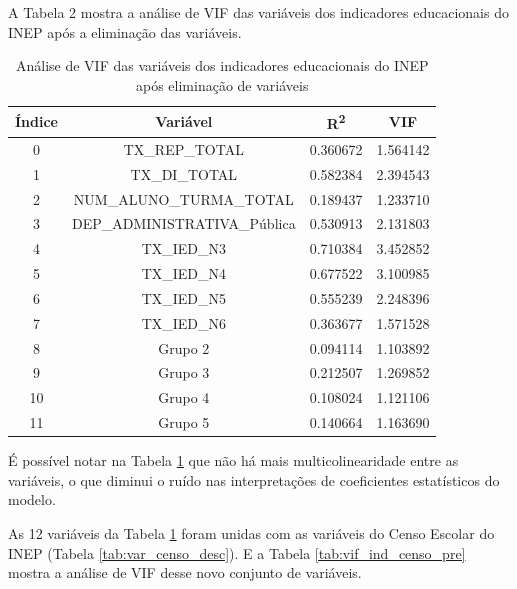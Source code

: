 \documentclass[english, spanish, brazilian]{RBIEarticle} %
\begin{document}
A Tabela 2 mostra a  análise de VIF das variáveis dos indicadores educacionais do INEP após a eliminação das variáveis.

\begin{table}[H]
\centering
\begin{tabular}{ccc c}
\hline
\textbf{Índice} & \textbf{Variável} & \textbf{R\textsuperscript{2}} & \textbf{VIF} \\ 
\hline
0  & TX\_REP\_TOTAL               & 0.360672 & 1.564142 \\
1  & TX\_DI\_TOTAL                & 0.582384 & 2.394543 \\
2  & NUM\_ALUNO\_TURMA\_TOTAL     & 0.189437 & 1.233710 \\
3  & DEP\_ADMINISTRATIVA\_Pública & 0.530913 & 2.131803 \\
4  & TX\_IED\_N3                   & 0.710384 & 3.452852 \\
5  & TX\_IED\_N4                   & 0.677522 & 3.100985 \\
6  & TX\_IED\_N5                   & 0.555239 & 2.248396 \\
7  & TX\_IED\_N6                   & 0.363677 & 1.571528 \\
8  & Grupo 2                       & 0.094114 & 1.103892 \\
9  & Grupo 3                       & 0.212507 & 1.269852 \\
10 & Grupo 4                       & 0.108024 & 1.121106 \\
11 & Grupo 5                       & 0.140664 & 1.163690 \\
\hline
\end{tabular}
\caption{Análise de VIF das variáveis dos indicadores educacionais do INEP após eliminação de variáveis}
\label{tab:vif_ind_inep_pos}
\end{table}
 É possível notar na Tabela \ref{tab:vif_ind_inep_pos} que não há mais multicolinearidade entre as variáveis, o que diminui o ruído nas interpretações de coeficientes estatísticos do modelo.

As 12 variáveis da Tabela \ref{tab:vif_ind_inep_pos} foram unidas com as variáveis do Censo Escolar  do INEP (Tabela \ref{tab:var_censo_desc}). E a Tabela \ref{tab:vif_ind_censo_pre} mostra a análise de VIF desse novo conjunto de variáveis.
\end{document}
